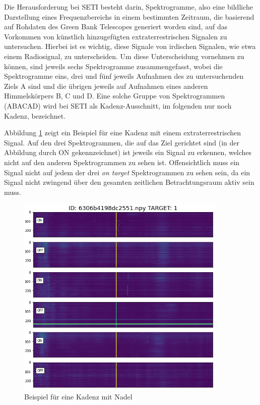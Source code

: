 \documentclass[12pt, a4paper]{article}
\begin{document}
Die Herausforderung bei SETI besteht darin, Spektrogramme, also eine bildliche Darstellung eines Frequenzbereichs in einem bestimmten Zeitraum, die basierend auf Rohdaten des Green Bank Telescopes generiert worden sind, auf das Vorkommen von künstlich hinzugefügten extraterrestrischen Signalen zu untersuchen. Hierbei ist es wichtig, diese Signale von irdischen Signalen, wie etwa einem Radiosignal, zu unterscheiden. Um diese Unterscheidung vornehmen zu können, sind jeweils sechs Spektrogramme zusammengefasst, wobei die Spektrogramme eins, drei und fünf jeweils Aufnahmen des zu untersuchenden Ziels \glqq A\grqq{} sind und die übrigen jeweils auf Aufnahmen eines anderen Himmelskörpers \glqq B\grqq{}, \glqq C\grqq{} und \glqq D\grqq{}. Eine solche Gruppe von Spektrogrammen (ABACAD) wird bei SETI als Kadenz-Ausschnitt, im folgenden nur noch \glqq Kadenz\grqq{}, bezeichnet.

Abbildung \ref{fig:kadenz_pos_1} zeigt ein Beispiel für eine Kadenz mit einem extraterrestrischen Signal. Auf den drei Spektrogrammen, die auf das Ziel gerichtet sind (in der Abbildung durch \glqq ON\grqq{} gekennzeichnet) ist jeweils ein Signal zu erkennen, welches nicht auf den anderen Spektrogrammen zu sehen ist. Offensichtlich muss ein Signal nicht auf jedem der drei \emph{on target} Spektrogrammen zu sehen sein, da ein Signal nicht zwingend über den gesamten zeitlichen Betrachtungsraum aktiv sein muss.

\begin{figure}[t]
	\centering
	\includegraphics[width=0.9\textwidth]{"img/kadenz_pos_1.png"}
	\caption{Beispiel für eine Kadenz mit Nadel}
\label{fig:kadenz_pos_1}
\end{figure}
\end{document}
